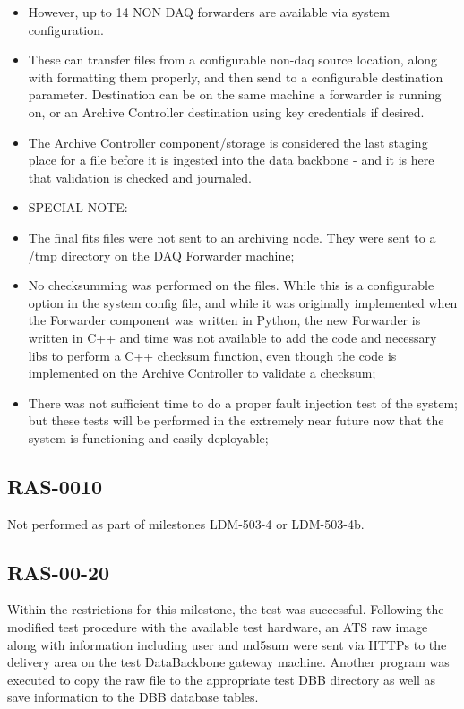 \documentclass[DM,lsstdraft,STR,toc]{lsstdoc}
\begin{document}
\begin{itemize}
{}
 \item{
However, up to 14 NON DAQ forwarders are available via system configuration. 
}
 \item{
These can transfer files from a configurable non-daq source location, along with formatting them properly, and then send to a configurable destination parameter. Destination can be on the same machine a forwarder is running on, or an Archive Controller destination using key credentials if desired. 
}
 \item{
The Archive Controller component/storage is considered the last staging place for a file before it is ingested into the data backbone - and it is here that validation is checked and journaled.
}
\end{itemize}

\begin{itemize}

  \item{SPECIAL NOTE:}
  \item{The final fits files were not sent to an archiving node. They were sent to a /tmp directory on the DAQ Forwarder machine; } 
  \item{No checksumming was performed on the files. While this is a configurable option in the system config file, and while it was originally implemented when the Forwarder component was written in Python, the new Forwarder is written in C++ and time was not available to add the code and necessary libs to perform a C++ checksum function, even though the code is implemented on the Archive Controller to validate a checksum; } 
  \item{ There was not sufficient time to do a proper fault injection test of the system; but these tests will be performed in the extremely near future now that the system is functioning and easily deployable;} 
\end{itemize}

\subsection{RAS-0010}
\label{sect:detail-RAS-00-10}
Not performed as part of milestones LDM-503-4 or LDM-503-4b.
\subsection{RAS-00-20}
\label{sect:detail-RAS-00-20}

Within the restrictions for this milestone, the test was successful.
Following the modified test procedure with the available test
hardware, an ATS raw image along with information including user
and md5sum were sent via HTTPs to the delivery area on the test
DataBackbone gateway machine.   Another program was executed to
copy the raw file to the appropriate test DBB directory as well as
save information to the DBB database tables.
\end{document}
